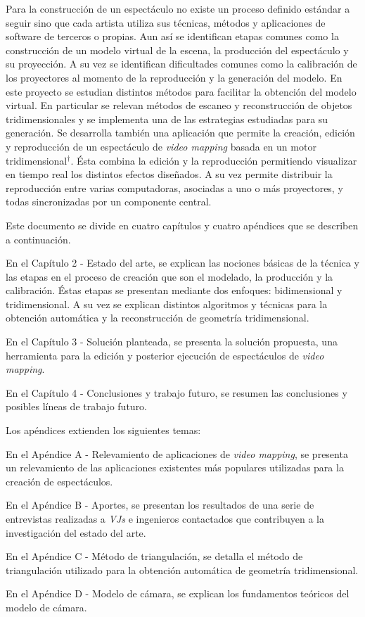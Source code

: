 Para la construcción de un espectáculo no existe un proceso definido estándar a seguir sino que cada artista utiliza sus técnicas, métodos y aplicaciones de software de terceros o propias. Aun así se identifican etapas comunes como la construcción de un modelo virtual de la escena, la producción del espectáculo y su proyección. A su vez se identifican dificultades comunes como la calibración de los proyectores al momento de la reproducción y la generación del modelo.
En este proyecto se estudian distintos métodos para facilitar la obtención del modelo virtual. En particular se relevan métodos de escaneo y reconstrucción de objetos tridimensionales y se implementa una de las estrategias estudiadas para su generación.
Se desarrolla también una aplicación que permite la creación, edición y reproducción de un espectáculo de \emph{video mapping} basada en un motor tridimensional$^\dagger$. Ésta combina la edición y la reproducción permitiendo visualizar en tiempo real los distintos efectos diseñados. A su vez permite distribuir la reproducción entre varias computadoras, asociadas a uno o más proyectores, y todas sincronizadas por un componente central.

Este documento se divide en cuatro capítulos y cuatro apéndices que se describen a continuación.

En el Capítulo 2 - Estado del arte, se explican las nociones básicas de la técnica y las etapas en el proceso de creación que son el modelado, la producción y la calibración. Éstas etapas se presentan mediante dos enfoques: bidimensional y tridimensional. A su vez se explican distintos algoritmos y técnicas para la obtención automática y la reconstrucción de geometría tridimensional.

En el Capítulo 3 - Solución planteada, se presenta la solución propuesta, una herramienta para la edición y posterior ejecución de espectáculos de \emph{video mapping}.

En el Capítulo 4 - Conclusiones y trabajo futuro, se resumen las conclusiones y posibles líneas de trabajo futuro.

Los apéndices extienden los siguientes temas:

En el Apéndice A - Relevamiento de aplicaciones de \emph{video mapping}, se presenta un relevamiento de las aplicaciones existentes más populares utilizadas para la creación de espectáculos.

En el Apéndice B - Aportes, se presentan los resultados de una serie de entrevistas realizadas a \emph{VJs} e ingenieros contactados que contribuyen a la investigación del estado del arte.

En el Apéndice C - Método de triangulación, se detalla el método de triangulación utilizado para la obtención automática de geometría tridimensional.

En el Apéndice D - Modelo de cámara, se explican los fundamentos teóricos del modelo de cámara.
